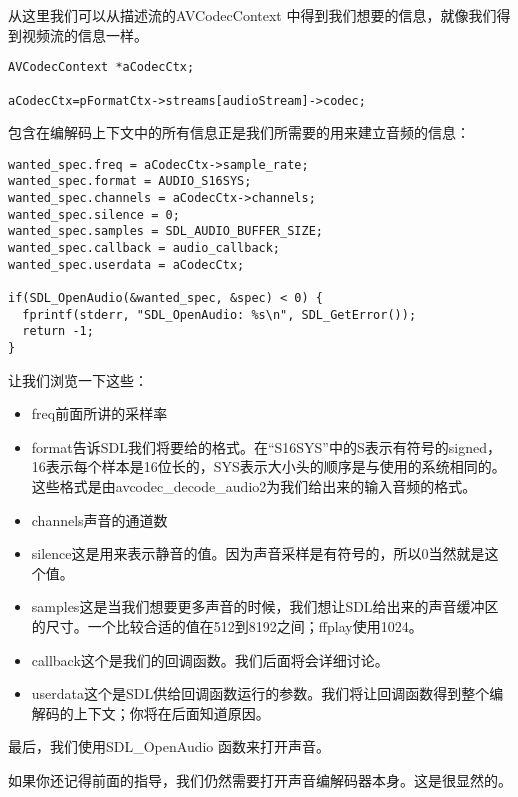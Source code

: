 从这里我们可以从描述流的AVCodecContext 中得到我们想要的信息，就像我们得到视频流的信息一样。

\begin{lstlisting}
AVCodecContext *aCodecCtx;

aCodecCtx=pFormatCtx->streams[audioStream]->codec;
\end{lstlisting}

包含在编解码上下文中的所有信息正是我们所需要的用来建立音频的信息：

\begin{lstlisting}
wanted_spec.freq = aCodecCtx->sample_rate;
wanted_spec.format = AUDIO_S16SYS;
wanted_spec.channels = aCodecCtx->channels;
wanted_spec.silence = 0;
wanted_spec.samples = SDL_AUDIO_BUFFER_SIZE;
wanted_spec.callback = audio_callback;
wanted_spec.userdata = aCodecCtx;

if(SDL_OpenAudio(&wanted_spec, &spec) < 0) {
  fprintf(stderr, "SDL_OpenAudio: %s\n", SDL_GetError());
  return -1;
}
\end{lstlisting}

让我们浏览一下这些：
\begin{itemize}
  \item freq前面所讲的采样率

  \item format告诉SDL我们将要给的格式。在“S16SYS”中的S表示有符号的signed，16表示每个样本是16位长的，SYS表示大小头的顺序是与使用的系统相同的。这些格式是由avcodec_decode_audio2为我们给出来的输入音频的格式。

  \item channels声音的通道数

  \item silence这是用来表示静音的值。因为声音采样是有符号的，所以0当然就是这个值。

  \item samples这是当我们想要更多声音的时候，我们想让SDL给出来的声音缓冲区的尺寸。一个比较合适的值在512到8192之间；ffplay使用1024。

  \item callback这个是我们的回调函数。我们后面将会详细讨论。

  \item userdata这个是SDL供给回调函数运行的参数。我们将让回调函数得到整个编解码的上下文；你将在后面知道原因。

\end{itemize}

最后，我们使用SDL_OpenAudio 函数来打开声音。

如果你还记得前面的指导，我们仍然需要打开声音编解码器本身。这是很显然的。

